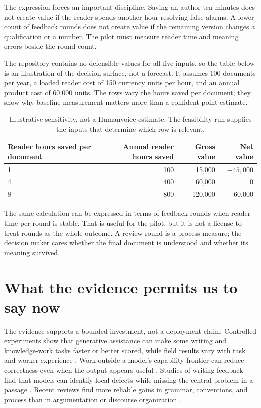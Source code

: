 The expression forces an important discipline. Saving an author ten minutes
does not create value if the reader spends another hour resolving false
alarms. A lower count of feedback rounds does not create value if the remaining
version changes a qualification or a number. The pilot must measure reader
time and meaning errors beside the round count.

The repository contains no defensible values for all five inputs, so the table
below is an illustration of the decision surface, not a forecast. It assumes
100 documents per year, a loaded reader cost of 150 currency units per hour,
and an annual product cost of 60,000 units. The rows vary the hours saved per
document; they show why baseline measurement matters more than a confident
point estimate.

\begin{table}[H]
\centering
\small
\begin{tabular}{@{}lrrr@{}}
\toprule
Reader hours saved per document & Annual reader hours saved & Gross value & Net value \\
\midrule
1 & 100 & 15,000 & $-45,000$ \\
4 & 400 & 60,000 & 0 \\
8 & 800 & 120,000 & 60,000 \\
\bottomrule
\end{tabular}
\caption{Illustrative sensitivity, not a Humanvoice estimate. The feasibility
run supplies the inputs that determine which row is relevant.}
\label{tab:value-sensitivity}
\end{table}

The same calculation can be expressed in terms of feedback rounds when reader
time per round is stable. That is useful for the pilot, but it is not a license
to treat rounds as the whole outcome. A review round is a process measure; the
decision maker cares whether the final document is understood and whether its
meaning survived.

\section{What the evidence permits us to say now}

The evidence supports a bounded investment, not a deployment claim. Controlled
experiments show that generative assistance can make some writing and
knowledge-work tasks faster or better scored, while field results vary with
task and worker experience \citep{noy2023experimental,brynjolfsson2025work,dillon2025shifting}.
Work outside a model's capability frontier can reduce correctness even when
the output appears useful \citep{dellacqua2026jagged}. Studies of writing
feedback find that models can identify local defects while missing the central
problem in a passage \citep{nair2024closing,rashkin2025story}. Recent reviews
find more reliable gains in grammar, conventions, and process than in
argumentation or discourse organization \citep{meng2026systematic,abudalfa2026awe}.

